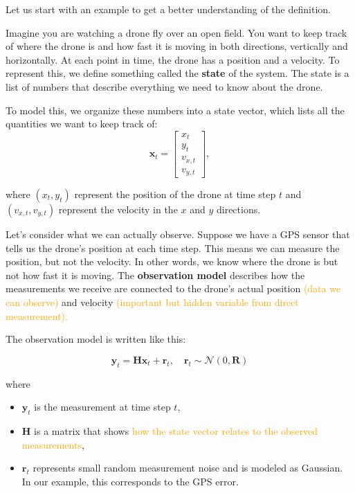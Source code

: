 \noindent Let us start with an example to get a better understanding of the definition.
\begin{example}
Imagine you are watching a drone fly over an open field. You want to keep track of where the drone is and how fast it is moving in both directions, vertically and horizontally. At each point in time, the drone has a position and a velocity. To represent this, we define something called the \textbf{state} of the system. The state is a list of numbers that describe everything we need to know about the drone.

To model this, we organize these numbers into a state vector, which lists all the quantities we want to keep track of: 
\[ \mathbf{x}_t = \begin{bmatrix}
    x_t \\ y_t \\ v_{x,t} \\ v_{y,t}
\end{bmatrix},\]

where $(x_t,y_t)$ represent the position of the drone at time step $t$ and $(v_{x,t},v_{y,t})$ represent the velocity in the $x$ and $y$ directions. 



\medskip
Let's consider what we can actually observe. Suppose we have a GPS sensor that tells us the drone's position at each time step. This means we can measure the position, but not the velocity. In other words, we know where the drone is but not how fast it is moving. The \textbf{observation model} describes how the measurements we receive are connected to the drone's actual position \textcolor{orange}{(data we can observe)} and velocity \textcolor{orange}{(important but hidden variable from direct measurement).} 

The observation model is written like this: 

\begin{equation}\label{eq: observation model}
\mathbf{y}_t = \mathbf{H}\mathbf{x}_{t}+\mathbf{r}_{t}, \quad \mathbf{r}_t \sim \mathcal{N}(0, \mathbf{R})
\end{equation}

where 
\begin{itemize}
    \item $\mathbf{y}_t$ is the measurement at time step $t$,
    \item $\mathbf{H}$ is a matrix that shows \textcolor{orange}{how the state vector relates to the observed measurements},
    \item $\mathbf{r}_t$ represents small random measurement noise and is modeled as Gaussian. In our example, this corresponds to the GPS error. 
\end{itemize}


\end{example}
